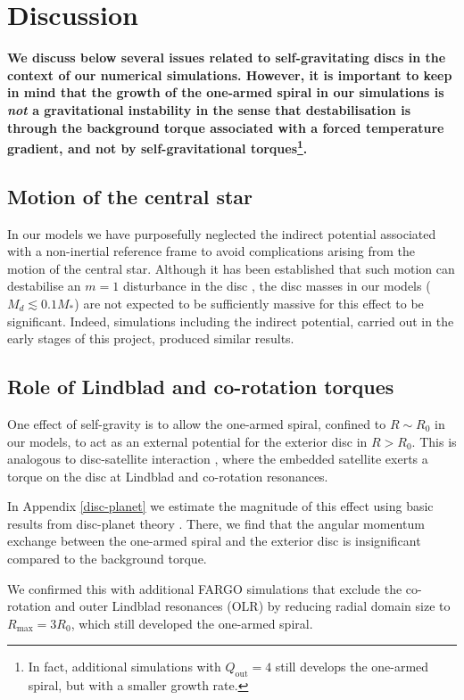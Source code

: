 \section{Discussion}\label{discussions} 
{\bf
  We discuss below several issues related to self-gravitating
  discs in the context of our numerical simulations. However, it is
  important to keep in mind that 
  the growth of the one-armed spiral in our simulations is
  \emph{not} a gravitational instability in the sense that
  destabilisation is through the background torque associated with a
  forced temperature gradient, and not by self-gravitational torques\footnote{In fact, additional simulations with $Q_\mathrm{out}=4$ still
  develops the one-armed spiral, but with a smaller growth rate.}. 
}

{\bf
  \subsection{Motion of the central star} 
  In our models we have purposefully neglected the indirect potential
  associated with a non-inertial reference frame to avoid
  complications arising from the motion of the central star.  
  Although it has been established that such motion can destabilise an
  $m=1$ disturbance in the disc \citep{adams89,shu90,michael10}, 
  the disc masses in our models ($M_d\lesssim 
  0.1 M_*$) are not expected to be sufficiently massive for this effect to be
  significant. Indeed, simulations including the
  indirect potential, carried out in the early stages of this project,
  produced similar results.    
  
  \subsection{Role of Lindblad and co-rotation torques}
  One effect of self-gravity is to allow the one-armed spiral,
  confined to $R\sim R_0$ in our models, to act as an external potential for the
  exterior disc in $R>R_0$. This is 
  analogous to disc-satellite interaction 
  \citep{goldreich79}, where the embedded satellite exerts a torque on
  the disc at Lindblad and co-rotation resonances. 

  In Appendix \ref{disc-planet} we estimate the magnitude of this effect
  using basic results from disc-planet theory \citep[see, e.g.][and
  references therein]{papaloizou07}. There, we find that the angular
  momentum exchange between the one-armed spiral and the exterior disc
  is insignificant compared to the background torque.  
  
  We confirmed this with additional FARGO simulations that exclude the
  co-rotation and outer Lindblad resonances (OLR) by reducing radial domain
  size to $R_\mathrm{max} = 3 R_0$, which still developed 
  the one-armed spiral. 
}


